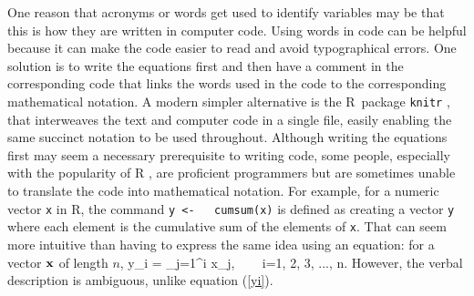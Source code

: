 One reason that acronyms or words get used to identify variables may be
that this is how they are written in computer code. Using words in code
can be helpful because it can make the code easier to read and avoid typographical
errors. One solution is to write the equations first and then have a
comment in the corresponding code that links the words used in the code to the
corresponding mathematical
notation. A modern simpler alternative is the R~package {\tt knitr} \citep{xie18},
that interweaves the text and computer code in a
single file, easily enabling the same succinct notation to be used throughout.
Although writing the equations first may seem a necessary
prerequisite to writing code, some people, especially with the popularity of R
\citep{R18}, are proficient programmers but are sometimes unable to translate the
code into mathematical notation. For example,
for a numeric vector {\tt x} in R, the command
\eb
\nonumber
{\tt y <\!\!\!- ~ cumsum(x)}
\label{cumsum}
\ee
is defined as creating a vector {\tt y} where each element is the cumulative sum
of the elements of {\tt x}. That can seem more intuitive than having to
express the same
idea using an equation: for a vector ${\bf x}$ of length $n$,
\eb
y_i = \sum_{j=1}^i x_j, ~~~ i=1, 2, 3, ..., n.
\label{yi}
\ee
However, the verbal description is ambiguous, unlike equation (\ref{yi}).

